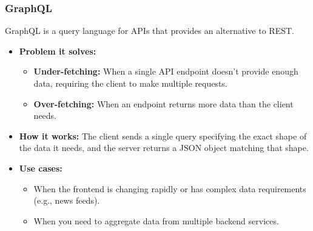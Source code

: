\documentclass{article}
\begin{document}
\subsubsection{GraphQL}
GraphQL is a query language for APIs that provides an alternative to REST.
\begin{itemize}
    \item \textbf{Problem it solves:}
    \begin{itemize}
        \item \textbf{Under-fetching:} When a single API endpoint doesn't provide enough data, requiring the client to make multiple requests.
        \item \textbf{Over-fetching:} When an endpoint returns more data than the client needs.
    \end{itemize}
    \item \textbf{How it works:} The client sends a single query specifying the exact shape of the data it needs, and the server returns a JSON object matching that shape.
    \item \textbf{Use cases:}
    \begin{itemize}
        \item When the frontend is changing rapidly or has complex data requirements (e.g., news feeds).
        \item When you need to aggregate data from multiple backend services.
    \end{itemize}
\end{itemize}
\end{document}
